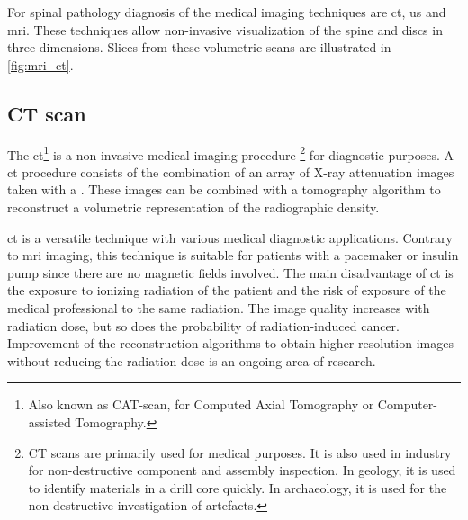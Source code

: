 
\par{
    For spinal pathology diagnosis of the  medical imaging techniques are \acrfull{ct}, \acrfull{us} and \acrfull{mri}. 
    These techniques allow non-invasive visualization of the spine and discs in three dimensions.
    Slices from these volumetric scans are illustrated in \ref{fig:mri_ct}.
}

\subsection{CT scan}
\par{
    The \acrfull{ct}\footnote{Also known as CAT-scan, for Computed Axial Tomography or Computer-assisted Tomography.} is a non-invasive medical imaging procedure
    \footnote{CT scans are primarily used for medical purposes. 
    It is also used in industry for non-destructive component and assembly inspection.
    In geology, it is used to identify materials in a drill core quickly. In archaeology, it is used for the non-destructive investigation of artefacts. } 
    for diagnostic purposes. 
    A \acrlong{ct} procedure consists of the combination of an array of X-ray attenuation images taken with a . 
    These images can be combined with a tomography algorithm to reconstruct a volumetric representation of the radiographic density.
}
\par{
    \acrshort{ct} is a versatile technique with various medical diagnostic applications. 
    Contrary to \acrfull{mri} imaging, this technique is suitable for patients with a pacemaker or insulin pump since there are no magnetic fields involved.
    The main disadvantage of \acrshort{ct} is the exposure to ionizing radiation of the patient and the risk of exposure of the medical professional to the same radiation.
    The image quality increases with radiation dose, but so does the probability of radiation-induced cancer.
    Improvement of the reconstruction algorithms to obtain higher-resolution images without reducing the radiation dose is an ongoing area of research. 
}

